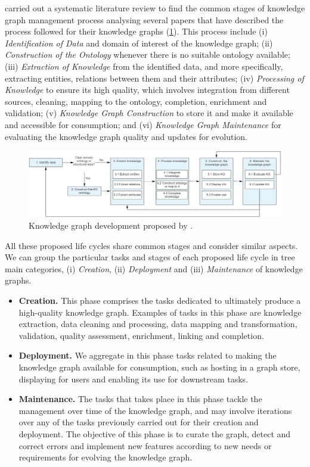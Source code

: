 \cite{tamavsauskaite2023defining} carried out a systematic literature review to find the common stages of knowledge graph management process analysing several papers that have described the process followed for their knowledge graphs (\cref{fig:chp2_kg-dev-process}). This process include  
(i) \textit{Identification of Data} and domain of interest of the knowledge graph;
(ii) \textit{Construction of the Ontology} whenever there is no suitable ontology available;
(iii) \textit{Extraction of Knowledge} from the identified data, and more specifically, extracting entities, relations between them and their attributes;
(iv) \textit{Processing of Knowledge} to ensure its high quality, which involves integration from different sources, cleaning, mapping to the ontology, completion, enrichment and validation;
(v) \textit{Knowledge Graph Construction} to store it and make it available and accessible for consumption;
and (vi) \textit{Knowledge Graph Maintenance} for evaluating the knowledge graph quality and updates for evolution.


\begin{figure}[]
\centering
\includegraphics[width=\linewidth]{figures/chp2_kg-dev-process.png}
\caption{Knowledge graph development proposed by \cite{tamavsauskaite2023defining}.}
\label{fig:chp2_kg-dev-process}
\end{figure}

All these proposed life cycles share common stages and consider similar aspects. We can group the particular tasks and stages of each proposed life cycle in tree main categories, (i) \textit{Creation}, (ii) \textit{Deployment} and (iii) \textit{Maintenance} of knowledge graphs. 
\begin{itemize}
    \item \textbf{Creation.} This phase comprises the tasks dedicated to ultimately produce a high-quality knowledge graph. Examples of tasks in this phase are knowledge extraction, data cleaning and processing, data mapping and transformation, validation, quality assessment, enrichment, linking and completion.

    \item \textbf{Deployment.} We aggregate in this phase tasks related to making the knowledge graph available for consumption, such as hosting in a graph store, displaying for users and enabling its use for downstream tasks. 

    \item \textbf{Maintenance.} The tasks that takes place in this phase tackle the management over time of the knowledge graph, and may involve iterations over any of the tasks previously carried out for their creation and deployment. The objective of this phase is to curate the graph, detect and correct errors and implement new features according to new needs or requirements for evolving the knowledge graph.
\end{itemize}

